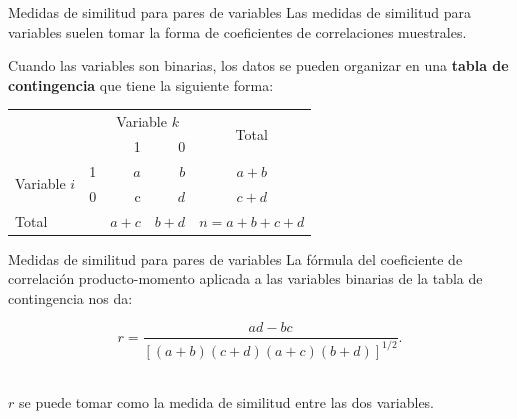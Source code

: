 \documentclass[spanish]{beamer}
\begin{document}
\begin{frame}{Medidas de similitud para pares de variables}
Las medidas de similitud para variables suelen tomar la forma de coeficientes de correlaciones muestrales.\break

Cuando las variables son binarias, los datos se pueden organizar en una \textbf{tabla de contingencia} que tiene la siguiente forma:
\begin{table}[h]
  \centering
  \label{tab:contingencia_var}
\resizebox{7.5cm}{!} {
\begin{tabular}{llrrrr}
\toprule
\multicolumn{2}{l}{\multirow{2}{*}{}} & \multicolumn{2}{c}{Variable $k$} & \multicolumn{2}{c}{\multirow{2}{*}{Total}} \\\cmidrule{3-4}
\multicolumn{2}{l}{}                  & 1             & 0       & \multicolumn{2}{c}{}                        \\ \hline
\multirow{2}{*}{Variable $i$}       & 1      & $a$          & $b$       & \multicolumn{2}{c}{$a+b$}                     \\
                              & 0      & c            & $d$       & \multicolumn{2}{c}{$c+d$}                     \\ \hline
\multicolumn{2}{l}{Total}            & $a+c$          & $b+d$     & \multicolumn{2}{c}{$n=a+b+c+d$}\\
\bottomrule            
\end{tabular}
}
\end{table}
\end{frame}

\begin{frame}{Medidas de similitud para pares de variables}
La fórmula del coeficiente de correlación producto-momento aplicada a las variables binarias de la tabla de contingencia nos da:\break

$$r = \frac{ad-bc}{[(a+b)(c+d)(a+c)(b+d)]^{1/2}}.$$\

$r$ se puede tomar como la medida de similitud entre las dos variables.
\end{frame}
\end{document}
